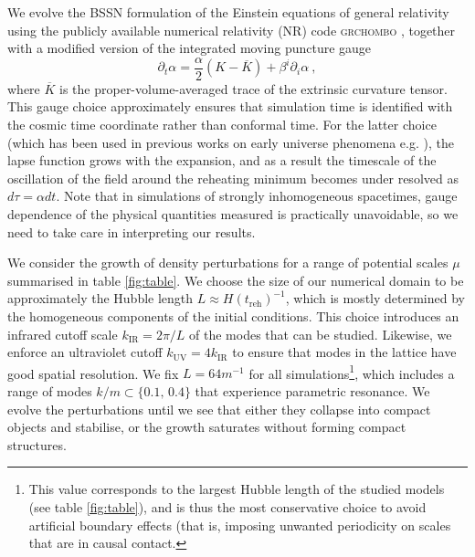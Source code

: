 \documentclass[
    reprint,
    preprintnumbers,
    superscriptaddress,
    nofootinbib,
     amsmath,amssymb,
     aps,
     prd,
    floatfix,
    ]{revtex4-2}
\begin{document}
We evolve the BSSN formulation of the Einstein equations of general relativity \cite{Nakamura:1987zz,Shibata:1995we,Baumgarte:1998te} using the publicly available numerical relativity (NR) code \textsc{grchombo} \cite{Andrade:2021rbd, Radia:2021smk,Clough:2015sqa}, together with a modified version of the integrated moving puncture gauge \cite{Campanelli:2005dd,Baker:2005vv,Kou:2019bbc,Giblin:2019nuv}
\begin{equation}
    \partial_t \alpha = \frac{\alpha}{2}\left(K-\overline{K}\right) + \beta^i\partial_i \alpha~,
\end{equation}
where $\overline{K}$ is the proper-volume-averaged trace of the extrinsic curvature tensor. This gauge choice approximately ensures that simulation time is identified with the cosmic time coordinate rather than conformal time. For the latter choice (which has been used in previous works on early universe phenomena e.g. \cite{Aurrekoetxea:2019fhr,deJong:2021bbo,Joana:2020rxm,Joana:2022uwc}), the lapse function grows with the expansion, and as a result the timescale of the oscillation of the field around the reheating minimum becomes under resolved as $d\tau = \alpha dt$. Note that in simulations of strongly inhomogeneous spacetimes, gauge dependence of the physical quantities measured is practically unavoidable, so we need to take care in interpreting our results.

We consider the growth of density perturbations for a range of potential scales $\mu$ summarised in table \ref{fig:table}. We choose the size of our numerical domain to be approximately the Hubble length $L\approx H(t_\mathrm{reh})^{-1}$, which is mostly determined by the homogeneous components of the initial conditions. This choice introduces an infrared cutoff scale $k_\mathrm{IR}=2\pi/L$ of the modes that can be studied. Likewise, we enforce an ultraviolet cutoff $k_\mathrm{UV}=4k_\mathrm{IR}$ to ensure that modes in the lattice have good spatial resolution. We fix $L=64 m^{-1}$ for all simulations\footnote{This value corresponds to the largest Hubble length of the studied models (see table \ref{fig:table}), and is thus the most conservative choice to avoid artificial boundary effects (that is, imposing unwanted periodicity on scales that are in causal contact.}, which includes a range of modes $k/m \subset \{0.1,\, 0.4\}$ that experience parametric resonance. We evolve the perturbations until we see that either they collapse into compact objects and stabilise, or the growth saturates without forming compact structures.
\end{document}
